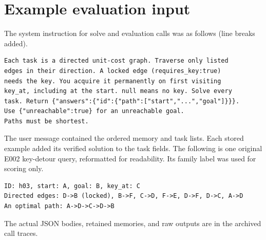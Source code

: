 \section{Example evaluation input}
\label{app:prompt}
The system instruction for solve and evaluation calls was as follows (line breaks added).
\begin{verbatim}
Each task is a directed unit-cost graph. Traverse only listed
edges in their direction. A locked edge (requires_key:true)
needs the key. You acquire it permanently on first visiting
key_at, including at the start. null means no key. Solve every
task. Return {"answers":{"id":{"path":["start","...","goal"]}}}.
Use {"unreachable":true} for an unreachable goal.
Paths must be shortest.
\end{verbatim}
The user message contained the ordered memory and task lists.
Each stored example added its verified solution to the task fields.
The following is one original E002 key-detour query, reformatted
for readability. Its family label was used for scoring only.
\begin{verbatim}
ID: h03, start: A, goal: B, key_at: C
Directed edges: D->B (locked), B->F, C->D, F->E, D->F, D->C, A->D
An optimal path: A->D->C->D->B
\end{verbatim}
The actual JSON bodies, retained memories, and raw outputs are
in the archived call traces.
